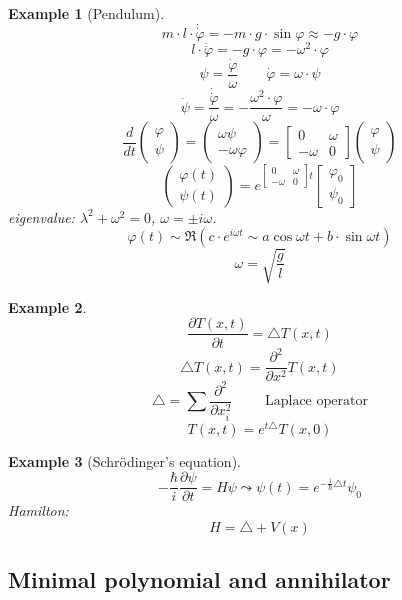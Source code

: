 \documentclass{article}
\newtheorem{example}{Example}  \numberwithin{example}{section}
\newcommand{\vectwo}[2]{\begin{pmatrix} #1 \\ #2 \end{pmatrix}}
\begin{document}
\begin{example}[Pendulum]
  \[ m \cdot l \cdot \dot{\dot{\varphi}} = -m \cdot g \cdot \sin{\varphi} \approx -g \cdot \varphi \]
  \[ l \cdot \ddot{\ddot{\varphi}} = -g \cdot \varphi = -\omega^2 \cdot \varphi \]
  \[ \psi = \frac{\dot{\varphi}}{\omega} \qquad \dot{\varphi} = \omega \cdot \psi \]
  \[ \dot{\psi} = \frac{\dot{\dot{\varphi}}}{\omega} = -\frac{\omega^2 \cdot \varphi}{\omega} = -\omega \cdot \varphi \]
  \[ \frac{d}{dt} \vectwo{\varphi}{\psi} = \vectwo{\omega \psi}{-\omega \varphi} = \begin{bmatrix} 0 & \omega \\ -\omega & 0 \end{bmatrix} \vectwo{\varphi}{\psi} \]
  \[ \begin{pmatrix} \varphi(t) \\ \psi(t) \end{pmatrix} = e^{\begin{bmatrix} 0 & \omega \\ -\omega & 0 \end{bmatrix} t} \begin{bmatrix} \varphi_0 \\ \psi_0 \end{bmatrix} \]
  eigenvalue: $\lambda^2 + \omega^2 = 0$, $\omega = \pm i\omega$.
  \[ \varphi(t) \sim \Re(c \cdot e^{i \omega t} \sim a \cos{\omega t} + b \cdot \sin{\omega t}) \]
  \[ \omega = \sqrt{\frac{g}{l}} \]
\end{example}

\begin{example}
  \[ \frac{\partial T(x,t)}{\partial t} = \triangle T(x, t) \]
  \[ \triangle T(x, t) = \frac{\partial^2}{\partial x^2} T(x, t) \]
  \[ \triangle = \sum \frac{\partial^2}{\partial x_i^2} \qquad \text{ Laplace operator} \]
  \[ T(x, t) = e^{t \triangle} T(x, 0) \]
\end{example}

\begin{example}[Schr\"odinger's equation]
  \[ -\frac{\hbar}{i} \frac{\partial \psi}{\partial t} = H\psi \leadsto \psi(t) = e^{-\frac i{\hbar} \triangle t} \psi_0 \]
  Hamilton:
  \[ H = \triangle + V(x) \]
\end{example}

\subsection{Minimal polynomial and annihilator}
\end{document}
